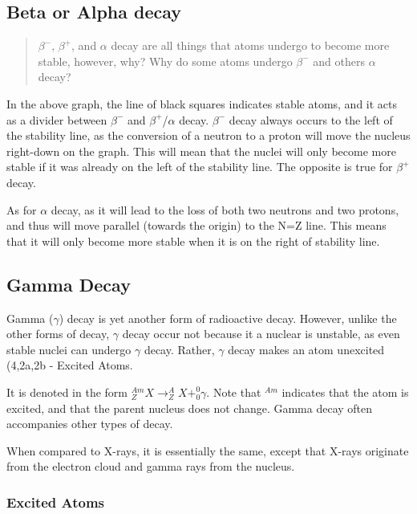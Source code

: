 \documentclass[
]{article}
\begin{document}
\hypertarget{beta-or-alpha-decay}{%
\subsection{Beta or Alpha decay}\label{beta-or-alpha-decay}}

\begin{quote}
{\(\beta^{-}\)}, {\(\beta^{+}\)}, and {\(\alpha\)} decay are all things
that atoms undergo to become more stable, however, why? Why do some
atoms undergo {\(\beta^{-}\)} and others {\(\alpha\)} decay?
\end{quote}

In the above graph, the line of black squares indicates stable atoms,
and it acts as a divider between {\(\beta^{-}\)} and
{\(\beta^{+}\)}/{\(\alpha\)} decay. {\(\beta^{-}\)} decay always occurs
to the left of the stability line, as the conversion of a neutron to a
proton will move the nucleus right-down on the graph. This will mean
that the nuclei will only become more stable if it was already on the
left of the stability line. The opposite is true for {\(\beta^{+}\)}
decay.

As for {\(\alpha\)} decay, as it will lead to the loss of both two
neutrons and two protons, and thus will move parallel (towards the
origin) to the N=Z line. This means that it will only become more stable
when it is on the right of stability line.

\hypertarget{gamma-decay}{%
\subsection{Gamma Decay}\label{gamma-decay}}

Gamma ({\(\gamma\)}) decay is yet another form of radioactive decay.
However, unlike the other forms of decay, {\(\gamma\)} decay occur not
because it a nuclear is unstable, as even stable nuclei can undergo
{\(\gamma\)} decay. Rather, {\(\gamma\)} decay makes an atom unexcited
(4,2a,2b - Excited Atoms.

It is denoted in the form
{\(_{Z}^{Am}X \rightarrow_{Z}^{A}X +_{0}^{0}\gamma\)}. Note that
{\(^{Am}\)} indicates that the atom is excited, and that the parent
nucleus does not change. Gamma decay often accompanies other types of
decay.

When compared to X-rays, it is essentially the same, except that X-rays
originate from the electron cloud and gamma rays from the nucleus.

\hypertarget{excited-atoms}{%
\subsubsection{Excited Atoms}\label{excited-atoms}}
\end{document}
